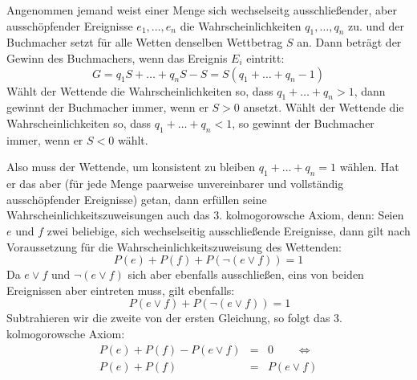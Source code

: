 \begin{enumerate}
  Angenommen jemand weist einer Menge sich wechselseitg ausschließender, aber
  ausschöpfender Ereignisse $e_1,\ldots, e_n$ die Wahrscheinlichkeiten
  $q_1,\ldots,q_n$ zu. und der Buchmacher setzt für alle Wetten denselben
  Wettbetrag $S$ an. Dann beträgt der Gewinn des Buchmachers, wenn das Ereignis
  $E_i$ eintritt:
  \[ G = q_1S + \ldots + q_nS - S = S(q_1 + \ldots + q_n -1) \]
  Wählt der Wettende die Wahrscheinlichkeiten so, dass $q_1 + \ldots + q_n > 1$,
  dann gewinnt der Buchmacher immer, wenn er $S > 0$ ansetzt. Wählt der
  Wettende die Wahrscheinlichkeiten so, dass $q_1 + \ldots + q_n < 1$, so
  gewinnt der Buchmacher immer, wenn er $S < 0$ wählt.
  
  
  Also muss der Wettende, um konsistent zu bleiben $q_1 + \ldots + q_n = 1$
  wählen. Hat er das aber (für jede Menge paarweise unvereinbarer und
  vollständig ausschöpfender Ereignisse) getan, dann erfüllen seine
  Wahrscheinlichkeitszuweisungen auch das 3. kolmogorowsche Axiom, denn:
  Seien $e$ und $f$ zwei beliebige, sich wechselseitig ausschließende
  Ereignisse, dann gilt nach Voraussetzung für die Wahrscheinlichkeitszuweisung
  des Wettenden: 
  \[ P(e) + P(f) + P(\neg (e \vee f)) = 1 \]
  Da $e \vee f$ und $\neg (e \vee f)$ sich aber ebenfalls ausschließen,
  eins von beiden Ereignissen aber eintreten muss, gilt ebenfalls: 
  \[\ P(e \vee f) + P(\neg (e \vee f)) = 1 \]
  Subtrahieren wir die zweite von der ersten Gleichung, so folgt das
  3. kolmogorowsche Axiom:
  \begin{eqnarray*} 
  P(e) + P(f) - P(e \vee f) & = & 0 \qquad \Leftrightarrow \\
  P(e) + P(f) & = & P(e \vee f) 
  \end{eqnarray*}


\end{enumerate}
